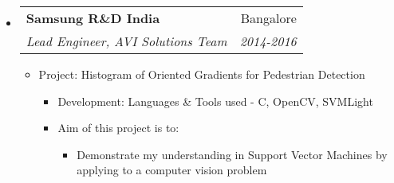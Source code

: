 \documentclass[letterpaper,11pt]{article}
\makeatletter
\def\CC{{C\nolinebreak[4]\hspace{-.05em}\raisebox{.4ex}{\tiny\bf ++}}}
\newcommand{\resitem}[1]{\item #1 \vspace{-2pt}}
\newcommand{\ressubheading}[4]{
	\begin{tabular*}{7.0in}{l@{\extracolsep{\fill}}r}
		\textbf{#1} & #2 \\
		\textit{#3} & \textit{#4} \\
	\end{tabular*}\vspace{-6pt}}
\makeatother
\begin{document}
\begin{itemize}
\begin{itemize}
\begin{itemize}
				\end{itemize}
		\end{itemize}
		\vspace{1mm}
	\item
		\ressubheading{Samsung R\&D India}{Bangalore}{Lead Engineer, AVI Solutions Team}{2014-2016}
		\vspace{1mm}
		\begin{itemize}
				\resitem[]{\faCircleO \hspace{1mm}Project: Histogram of Oriented Gradients for Pedestrian Detection}
				\begin{itemize}
						\resitem{Development: Languages \& Tools used - \CC, OpenCV, SVMLight}
				\end{itemize}
				\begin{itemize}
						\resitem{Aim of this project is to:}
						\begin{itemize}
								\resitem{Demonstrate my understanding in Support Vector Machines by applying to a computer vision problem}
						\end{itemize}
				\end{itemize}


\end{itemize}
\end{itemize}
\end{document}
